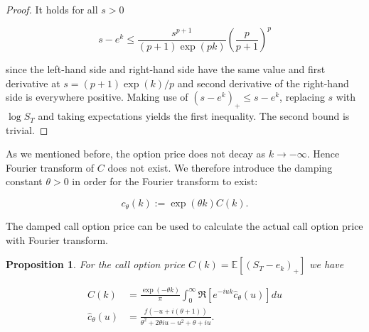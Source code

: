 \documentclass[12pt,twoside]{article}
\theoremstyle{plain}
\theoremstyle{plain}
\newtheorem{proposition}{Proposition}[section]
\theoremstyle{definition}
\theoremstyle{remark}
\numberwithin{equation}{section}
\begin{document}
\begin{proof}

It holds for all $s > 0$

$$
s - e^k \leq \frac{s^{p+1}}{(p+1) \exp (p k)}\left(\frac{p}{p+1}\right)^{p}
$$

since the left-hand side and right-hand side have the same value and first derivative at $s=(p+1) \exp (k) / p$ and second derivative of the right-hand side is everywhere positive. Making use of $(s - e^k)_+ \leq s-e^k$, replacing $s$ with $\log S_T$ and taking expectations yields the first inequality. The second bound is trivial.

\end{proof}

As we mentioned before, the option price does not decay as $k\rightarrow -\infty$. Hence Fourier transform of $C$ does not exist. We therefore introduce the damping constant $\theta > 0$ in order for the Fourier transform to exist:

$$
c_\theta(k) := \exp(\theta k) C(k).
$$

The damped call option price can be used to calculate the actual call option price with Fourier transform.

\begin{proposition}

For the call option price $C(k) = \mathbb E \left[(S_T-e_k)_+\right]$ we have

\begin{align}
C(k)&= \frac{\exp(-\theta k) }{\pi} \int_0^\infty \Re \left[ e^{-iuk} \hat c _\theta (u) \right] du \label{eq: fourier call price}\\[10pt]
\hat c _\theta (u) &= \frac{f(-u+i(\theta+1))}{\theta^{2}+2 \theta i u-u^{2}+\theta+i u}.
\end{align}


\end{proposition}
\end{document}
